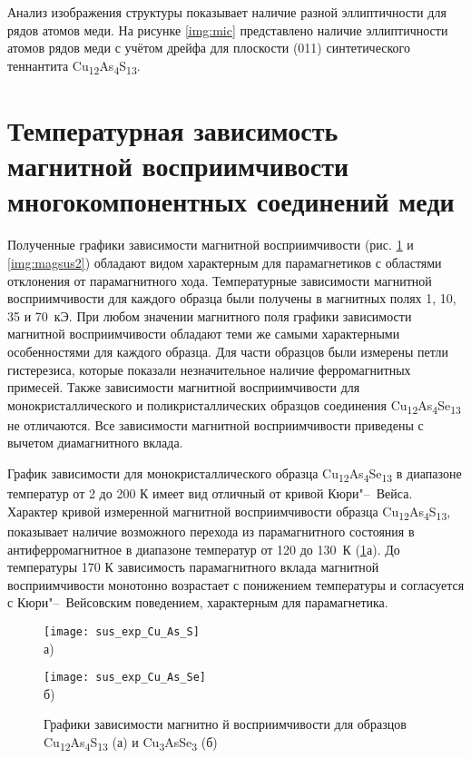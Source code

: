 Анализ изображения структуры показывает наличие разной эллиптичности для рядов атомов меди. На рисунке \ref{img:mic} представлено наличие эллиптичности атомов рядов меди с учётом дрейфа для плоскости (011) синтетического теннантита Cu\textsubscript{12}As\textsubscript{4}S\textsubscript{13}.




\newpage

\section{Температурная зависимость магнитной восприимчивости многокомпонентных соединений меди} \label{sect3_3}

Полученные графики зависимости магнитной восприимчивости (рис. \ref{img:magsus1} и \ref{img:magsus2}) обладают видом характерным для парамагнетиков с областями отклонения от парамагнитного хода.  Температурные зависимости магнитной восприимчивости для каждого образца были получены в магнитных полях 1, 10, 35 и 70~кЭ. При любом значении магнитного поля графики зависимости магнитной восприимчивости обладают теми же самыми характерными особенностями для каждого образца. Для части образцов были измерены петли гистерезиса, которые показали незначительное наличие ферромагнитных примесей. Также зависимости магнитной восприимчивости для монокристаллического и поликристаллических образцов соединения Cu\textsubscript{12}As\textsubscript{4}Se\textsubscript{13} не отличаются. Все зависимости магнитной восприимчивости приведены с вычетом диамагнитного вклада.

График зависимости для монокристаллического образца Cu\textsubscript{12}As\textsubscript{4}Se\textsubscript{13} в диапазоне температур от 2 до 200 К имеет вид отличный от кривой Кюри"--~Вейса.
 Характер кривой измеренной магнитной восприимчивости образца  Cu\textsubscript{12}As\textsubscript{4}S\textsubscript{13}, показывает наличие возможного перехода из парамагнитного состояния в антиферромагнитное в диапазоне температур от 120 до 130~К (\ref{img:magsus1}а).
До температуры 170 К зависимость парамагнитного вклада магнитной восприимчивости монотонно возрастает с понижением температуры и согласуется с Кюри"--~Вейсовским поведением, характерным для парамагнетика.

\begin{figure}[p!]
  \begin{minipage}[ht]{0.9\linewidth}\centering
    \texttt{[image: sus\_exp\_Cu\_As\_S]} \\ а)
  \end{minipage}
 \vfill
  \begin{minipage}[ht]{0.9\linewidth}\centering
    \texttt{[image: sus\_exp\_Cu\_As\_Se]} \\ б)
  \end{minipage}
      \caption[Графики зависимости магнитно	й восприимчивости для образцов Cu\textsubscript{12}As\textsubscript{4}Se\textsubscript{13} (а) и Cu\textsubscript{3}AsS\textsubscript{3} (б)]{Графики зависимости магнитно	й восприимчивости для образцов Cu\textsubscript{12}As\textsubscript{4}S\textsubscript{13} (а) и Cu\textsubscript{3}AsSe\textsubscript{3} (б)}
    \label{img:magsus1}
\end{figure}

